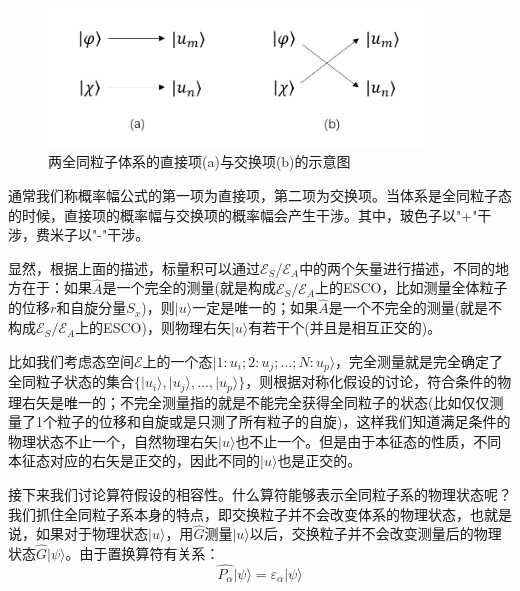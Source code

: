 \begin{remark}
        \begin{figure}[H]
            \centering
            \includegraphics[width=0.9\textwidth]{figure/identical_interfere.png}
            \caption{两全同粒子体系的直接项(a)与交换项(b)的示意图}
            \label{fig:identical_interfere}
        \end{figure}
        
        通常我们称概率幅公式的第一项为直接项，第二项为交换项。当体系是全同粒子态的时候，直接项的概率幅与交换项的概率幅会产生干涉。其中，玻色子以"+"干涉，费米子以"-"干涉。
        \end{remark}
        
        显然，根据上面的描述，标量积可以通过$\mathscr{E}_S$/$\mathscr{E}_A$中的两个矢量进行描述，不同的地方在于：如果$\hat{A}$是一个完全的测量(就是构成$\mathscr{E}_S/\mathscr{E}_A$上的ESCO，比如测量全体粒子的位移$r$和自旋分量$S_x$)，则$|u\rangle$一定是唯一的；如果$\hat{A}$是一个不完全的测量(就是不构成$\mathscr{E}_S/\mathscr{E}_A$上的ESCO)，则物理右矢$|u\rangle$有若干个(并且是相互正交的)。
        \begin{remark}
        比如我们考虑态空间$\mathscr{E}$上的一个态$|1:u_i;2:u_j;\dots;N:u_p\rangle$，完全测量就是完全确定了全同粒子状态的集合$\{|u_i\rangle,|u_j\rangle,\dots,|u_p\rangle\}$，则根据对称化假设的讨论，符合条件的物理右矢是唯一的；不完全测量指的就是不能完全获得全同粒子的状态(比如仅仅测量了1个粒子的位移和自旋或是只测了所有粒子的自旋)，这样我们知道满足条件的物理状态不止一个，自然物理右矢$|u\rangle$也不止一个。但是由于本征态的性质，不同本征态对应的右矢是正交的，因此不同的$|u\rangle$也是正交的。
        \end{remark}
       
        接下来我们讨论算符假设的相容性。什么算符能够表示全同粒子系的物理状态呢？我们抓住全同粒子系本身的特点，即交换粒子并不会改变体系的物理状态，也就是说，如果对于物理状态$|u\rangle$，用$\hat{G}$测量$|u\rangle$以后，交换粒子并不会改变测量后的物理状态$\hat{G}|\psi\rangle$。由于置换算符有关系：
        \begin{equation}
            \hat{P_\alpha}|\psi\rangle=\varepsilon_\alpha|\psi\rangle
        \end{equation}
        
